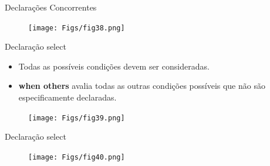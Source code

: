 \documentclass[aspectratio=169]{beamer}
\begin{document}
\begin{frame}{Declarações Concorrentes}
	\justifying
	
%	
%	
%		
	
	\begin{figure}[h]
		\centering
		\texttt{[image: Figs/fig38.png]}
	\end{figure}
	
	
\end{frame}
\begin{frame}{Declaração select}
	\justifying
	

	
	
	\begin{block}{}
		\begin{itemize}
		\item Todas as possíveis condições devem ser consideradas.
		\item \textbf{when others} avalia todas as outras condições possíveis que não são especificamente declaradas.
		\end{itemize}
		
	\end{block}
	
	\begin{figure}[h]
		\centering
		\texttt{[image: Figs/fig39.png]}
	\end{figure}
	
	
\end{frame}
\begin{frame}{Declaração select}
	\justifying
	
	
	\begin{figure}[h]
		\centering
		\texttt{[image: Figs/fig40.png]}
	\end{figure}
	
	
\end{frame}
\end{document}
